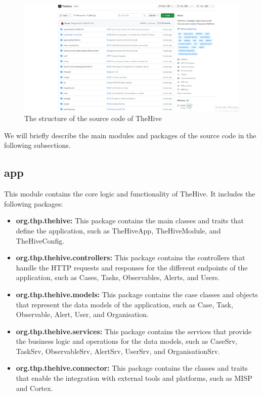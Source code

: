 \documentclass{article}
\begin{document}
\begin{figure}[ht]
  \centering
  \includegraphics[width=0.8\linewidth]{code.png}
  \caption{The structure of the source code of TheHive}
  \label{fig:source_code_structure}
\end{figure}
We will briefly describe the main modules and packages of the source code in the following subsections.

\subsection{app}

This module contains the core logic and functionality of TheHive. It includes the following packages:

\begin{itemize}
    \item \textbf{org.thp.thehive:} This package contains the main classes and traits that define the application, such as TheHiveApp, TheHiveModule, and TheHiveConfig.
    \item \textbf{org.thp.thehive.controllers:} This package contains the controllers that handle the HTTP requests and responses for the different endpoints of the application, such as Cases, Tasks, Observables, Alerts, and Users.
    \item \textbf{org.thp.thehive.models:} This package contains the case classes and objects that represent the data models of the application, such as Case, Task, Observable, Alert, User, and Organisation.
    \item \textbf{org.thp.thehive.services:} This package contains the services that provide the business logic and operations for the data models, such as CaseSrv, TaskSrv, ObservableSrv, AlertSrv, UserSrv, and OrganisationSrv.
    \item \textbf{org.thp.thehive.connector:} This package contains the classes and traits that enable the integration with external tools and platforms, such as MISP and Cortex.
\end{itemize}
\end{document}
